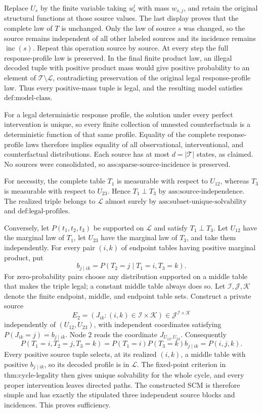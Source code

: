 Replace \(U_s\) by the finite variable taking \(u_s^j\) with mass \(w_{s,j}\), and retain the original structural functions at those source values.  The last display proves that the complete law of \(T\) is unchanged.  Only the law of source \(s\) was changed, so the source remains independent of all other labeled sources and its incidence remains \(\operatorname{inc}(s)\).  Repeat this operation source by source.  At every step the full response-profile law is preserved.  In the final finite product law, an illegal decoded tuple with positive product mass would give positive probability to an element of \(\mathcal T\setminus\mathcal L\), contradicting preservation of the original legal response-profile law.  Thus every positive-mass tuple is legal, and the resulting model satisfies \(\text{def:model-class}\).

For a legal deterministic response profile, the solution under every perfect intervention is unique, so every finite collection of unnested counterfactuals is a deterministic function of that same profile.  Equality of the complete response-profile laws therefore implies equality of all observational, interventional, and counterfactual distributions.  Each source has at most \(d=|\mathcal T|\) states, as claimed.  No sources were consolidated, so \(\text{ass:sparse-source-incidence}\) is preserved.

For necessity, the complete table \(T_1\) is measurable with respect to \(U_{12}\), whereas \(T_3\) is measurable with respect to \(U_{23}\).  Hence \(T_1\perp T_3\) by \(\text{ass:source-independence}\).  The realized triple belongs to \(\mathcal L\) almost surely by \(\text{ass:subset-unique-solvability}\) and \(\text{def:legal-profiles}\).

Conversely, let \(P(t_1,t_2,t_3)\) be supported on \(\mathcal L\) and satisfy \(T_1\perp T_3\).  Let \(U_{12}\) have the marginal law of \(T_1\), let \(U_{23}\) have the marginal law of \(T_3\), and take them independently.  For every pair \((i,k)\) of endpoint tables having positive marginal product, put
\[
 b_{j\mid ik}=P(T_2=j\mid T_1=i,T_3=k).
\]
For zero-probability pairs choose any distribution supported on a middle table that makes the triple legal; a constant middle table always does so.  Let \(\mathcal I,\mathcal J,\mathcal K\) denote the finite endpoint, middle, and endpoint table sets.  Construct a private source
\[
 E_2=(J_{ik}:(i,k)\in\mathcal I\times\mathcal K)\in
 \mathcal J^{\mathcal I\times\mathcal K}
\]
independently of \((U_{12},U_{23})\), with independent coordinates satisfying \(P(J_{ik}=j)=b_{j\mid ik}\).  Node \(2\) reads the coordinate \(J_{U_{12},U_{23}}\).  Consequently
\[
 P(T_1=i,T_2=j,T_3=k)=P(T_1=i)P(T_3=k)b_{j\mid ik}=P(i,j,k).
\]
Every positive source tuple selects, at its realized \((i,k)\), a middle table with positive \(b_{j\mid ik}\), so its decoded profile is in \(\mathcal L\).  The fixed-point criterion in \(\text{thm:cycle-legality}\) then gives unique solvability for the whole cycle, and every proper intervention leaves directed paths.  The constructed SCM is therefore simple and has exactly the stipulated three independent source blocks and incidences.  This proves sufficiency.


